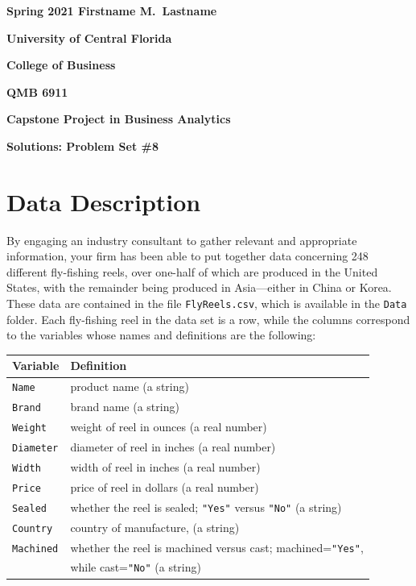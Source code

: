 \documentclass[11pt]{paper}
\begin{document}

\pagestyle{empty}
{\noindent\bf Spring 2021 \hfill Firstname M.~Lastname}
\vskip 16pt
\centerline{\bf University of Central Florida}
\centerline{\bf College of Business}
\vskip 16pt
\centerline{\bf QMB 6911}
\centerline{\bf Capstone Project in Business Analytics}
\vskip 10pt
\centerline{\bf Solutions:  Problem Set \#8}
\vskip 32pt
\noindent
% 
% 
\section{Data Description}
% 
By engaging an industry consultant to gather relevant and appropriate 
information, your firm has been able to put together data concerning 248 
different fly-fishing reels, over one-half of which are produced in the 
United States, with the remainder being produced in Asia---either in China 
or Korea.  These data are contained in the file {\tt FlyReels.csv}, which is
available in the {\tt Data} folder.
Each fly-fishing reel in the data set is a row, while the columns correspond 
to the variables whose names and definitions are the following:
\bigskip
\begin{table}[ht]
\centering
\begin{tabular}{ll}
  \hline
    Variable & Definition \\
  \hline

    {\tt Name}        &product name (a string) \\ 
    {\tt Brand}       &brand name (a string) \\ 
    {\tt Weight}      &weight of reel in ounces (a real number) \\ 
    {\tt Diameter}    &diameter of reel in inches (a real number) \\ 
    {\tt Width}       &width of reel in inches (a real number) \\ 
    {\tt Price}       &price of reel in dollars (a real number) \\ 
    {\tt Sealed}      &whether the reel is sealed; {\tt "Yes"} versus
                        {\tt "No"} (a string) \\ 
    {\tt Country}     &country of manufacture, (a string) \\ 
    {\tt Machined}    &whether the reel is machined versus cast;
                        machined={\tt "Yes"}, \\ 
                      &while cast={\tt "No"} (a string) \\ 
  \hline
\end{tabular}
\end{table}
\end{document}
